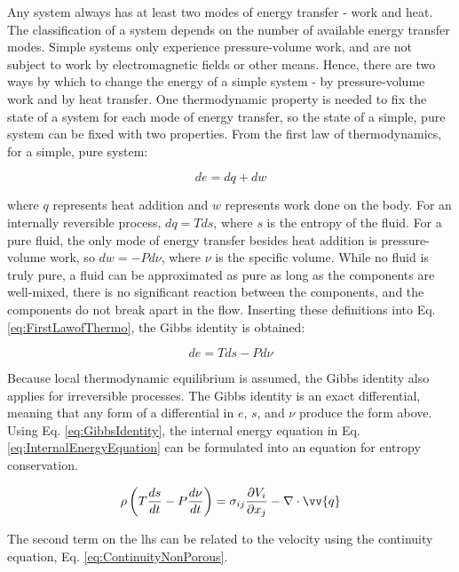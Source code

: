 \documentclass[10pt]{article}
\numberwithin{equation}{section} %
\begin{document}
Any system always has at least two modes of energy transfer - work and heat. The classification of a system depends on the number of available energy transfer modes. Simple systems only experience pressure-volume work, and are not subject to work by electromagnetic fields or other means. Hence, there are two ways by which to change the energy of a simple system - by pressure-volume work and by heat transfer. One thermodynamic property is needed to fix the state of a system for each mode of energy transfer, so the state of a simple, pure system can be fixed with two properties. From the first law of thermodynamics, for a simple, pure system:

\begin{equation}
\label{eq:FirstLawofThermo}
de=dq+dw
\end{equation}

where \(q\) represents heat addition and \(w\) represents work done on the body. For an internally reversible process, \(dq=Tds\), where \(s\) is the entropy of the fluid. For a pure fluid, the only mode of energy transfer besides heat addition is pressure-volume work, so \(dw=-Pd\nu\), where \(\nu\) is the specific volume. While no fluid is truly pure, a fluid can be approximated as pure as long as the components are well-mixed, there is no significant reaction between the components, and the components do not break apart in the flow. Inserting these definitions into Eq. \eqref{eq:FirstLawofThermo}, the Gibbs identity is obtained:

\begin{equation}
\label{eq:GibbsIdentity}
de=Tds-Pd\nu
\end{equation}

Because local thermodynamic equilibrium is assumed, the Gibbs identity also applies for irreversible processes. The Gibbs identity is an exact differential, meaning that any form of a differential in \(e\), \(s\), and \(\nu\) produce the form above. Using Eq. \eqref{eq:GibbsIdentity}, the internal energy equation in Eq. \eqref{eq:InternalEnergyEquation} can be formulated into an equation for entropy conservation.

\begin{equation}
\label{eq:EntropyEquation1}
\rho\left(T\frac{ds}{dt}-P\frac{d\nu}{dt}\right)=\sigma_{ij}\frac{\partial V_i}{\partial x_j}-\nabla\cdot\vv{q}
\end{equation}

The second term on the \gls{lhs} can be related to the velocity using the continuity equation, Eq. \eqref{eq:ContinuityNonPorous}.
\end{document}
